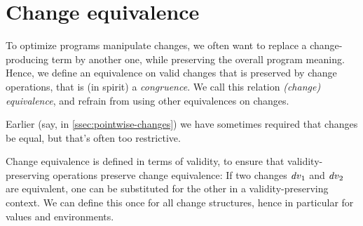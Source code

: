 
\section{Change equivalence}
\label{sec:change-equivalence}
To optimize programs manipulate changes, we often want to replace a
change-producing term by another one, while preserving the overall program
meaning. Hence, we define an equivalence on valid changes that is preserved by
change operations, that is (in spirit) a \emph{congruence}. We call this relation
\emph{(change) equivalence}, and refrain from using other
equivalences on changes.

Earlier (say, in \cref{ssec:pointwise-changes}) we have sometimes required that
changes be equal, but that's often too restrictive.

Change equivalence is defined in terms of validity, to ensure that
validity-preserving operations preserve change equivalence: If two changes \ensuremath{\Varid{dv}_{1}}
and \ensuremath{\Varid{dv}_{2}} are equivalent, one can be substituted for the other in a
validity-preserving context. We can define this once for all change
structures, hence in particular for values and environments.

